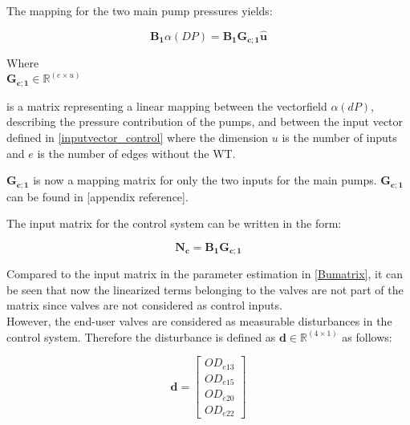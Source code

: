 The mapping for the two main pump pressures yields:

\begin{equation}
\pmb{B_1} \alpha(DP) = \pmb{B_1} \pmb{G_{c;1}} \pmb{\hat{u}}
\label{mapping_main}
\end{equation}


\begin{minipage}[t]{0.20\textwidth}
Where\\
\hspace*{8mm} $\pmb{G_{c;1}} \in \pmb{\mathbb{R}}^{(e \times u)} $ 
\end{minipage}
\begin{minipage}[t]{0.68\textwidth}
\vspace*{2mm}
is a matrix representing a linear mapping between the vectorfield $\alpha(dP)$, describing the pressure contribution of the pumps, and between the input vector defined in \eqref{inputvector_control} where the dimension $u$ is the number of inputs and $e$ is the number of edges without the WT. 
\end{minipage} 

$\pmb{G_{c;1}}$ is now a mapping matrix for only the two inputs for the main pumps. $\pmb{G_{c;1}}$ can be found in [appendix reference].

The input matrix for the control system can be written in the form: 

\begin{equation}
  \pmb{N_c} =  \pmb{B_1}\pmb{G_{c;1}}  
\label{inputmatrix_control}	
\end{equation}

Compared to the input matrix in the parameter estimation in \eqref{Bumatrix}, it can be seen that now the linearized terms belonging to the valves are not part of the matrix since valves are not considered as control inputs. 
\\
However, the end-user valves are considered as measurable disturbances in the control system. Therefore the disturbance is defined as $\pmb{d} \in \pmb{\mathbb{R}}^{(4 \times 1)}$ as follows: 

\begin{equation}
\pmb{d} =
\begin{bmatrix} 
OD_{e13} \\
OD_{e15} \\
OD_{e20} \\
OD_{e22} 
\label{disturbancevector_control}
\end{bmatrix} 
\end{equation}

